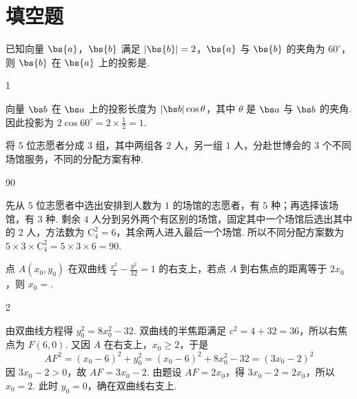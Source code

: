 \section{填空题}

\begin{problem}
已知向量 \(\bs{a}\)，\(\bs{b}\) 满足 \(\lvert\bs{b}\rvert = 2\)，\(\bs{a}\) 与 \(\bs{b}\) 的夹角为 \(60^\circ\)，则 \(\bs{b}\) 在 \(\bs{a}\) 上的投影是\fillinblank{}.
\end{problem}

\begin{answer}
1
\end{answer}

\begin{solution}
向量 \(\bs b\) 在 \(\bs a\) 上的投影长度为 \(\lvert\bs b\rvert\cos\theta\)，其中 \(\theta\) 是 \(\bs a\) 与 \(\bs b\) 的夹角. 因此投影为 \(2\cos60^\circ=2\times\frac12=1\).
\end{solution}

\begin{problem}
将 \(5\) 位志愿者分成 \(3\) 组，其中两组各 \(2\) 人，另一组 \(1\) 人，分赴世博会的 \(3\) 个不同场馆服务，不同的分配方案有\fillinblank{}种.
\end{problem}

\begin{answer}
90
\end{answer}

\begin{solution}
先从 \(5\) 位志愿者中选出安排到人数为 \(1\) 的场馆的志愿者，有 \(5\) 种；再选择该场馆，有 \(3\) 种. 剩余 \(4\) 人分到另外两个有区别的场馆，固定其中一个场馆后选出其中的 \(2\) 人，方法数为 \(\mathrm C_{4}^{2}=6\)，其余两人进入最后一个场馆. 所以不同分配方案数为 \(5\times3\times\mathrm C_{4}^{2}=5\times3\times6=90\).
\end{solution}

\begin{problem}
点 \(A(x_{0},y_{0})\) 在双曲线 \(\frac{x^{2}}{4}-\frac{y^{2}}{32}=1\) 的右支上，若点 \(A\) 到右焦点的距离等于 \(2x_{0}\)，则 \(x_{0}=\)\fillinblank{}.
\end{problem}

\begin{answer}
2
\end{answer}

\begin{solution}
由双曲线方程得 \(y_{0}^{2}=8x_{0}^{2}-32\). 双曲线的半焦距满足 \(c^{2}=4+32=36\)，所以右焦点为 \(F(6,0)\). 又因 \(A\) 在右支上，\(x_{0}\geqslant2\)，于是
\[
AF^{2}=(x_{0}-6)^{2}+y_{0}^{2}=(x_{0}-6)^{2}+8x_{0}^{2}-32=(3x_{0}-2)^{2}
\]
因 \(3x_{0}-2>0\)，故 \(AF=3x_{0}-2\). 由题设 \(AF=2x_{0}\)，得 \(3x_{0}-2=2x_{0}\)，所以 \(x_{0}=2\). 此时 \(y_{0}=0\)，确在双曲线右支上.
\end{solution}

